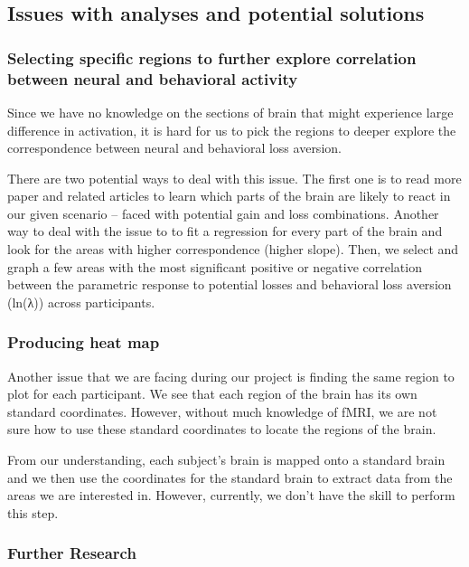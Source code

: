 \subsection{Issues with analyses and potential solutions}

\subsubsection{Selecting specific regions to further explore correlation between neural and behavioral activity}

\indent \indent Since we have no knowledge on the sections of brain that might experience large difference in activation, it is hard for us to pick the regions to deeper explore the correspondence between neural and behavioral loss aversion.

There are two potential ways to deal with this issue. The first one is to read more paper and related articles to learn which parts of the brain are likely to react in our given scenario -- faced with potential gain and loss combinations. Another way to deal with the issue to to fit a regression for every part of the brain and look for the areas with higher correspondence (higher slope). Then, we select and graph a few areas with the most significant positive or negative correlation between the parametric response to potential losses and behavioral loss aversion (ln(λ)) across participants.

\subsubsection{Producing heat map}

\indent \indent Another issue that we are facing during our project is finding the same region to plot for each participant. We see that each region of the brain has its own standard coordinates. However, without much knowledge of fMRI, we are not sure how to use these standard coordinates to locate the regions of the brain.

From our understanding, each subject's brain is mapped onto a standard brain and we then use the coordinates for the standard brain to extract data from the areas we are interested in. However, currently, we don't have the skill to perform this step.

\subsubsection{Further Research}

